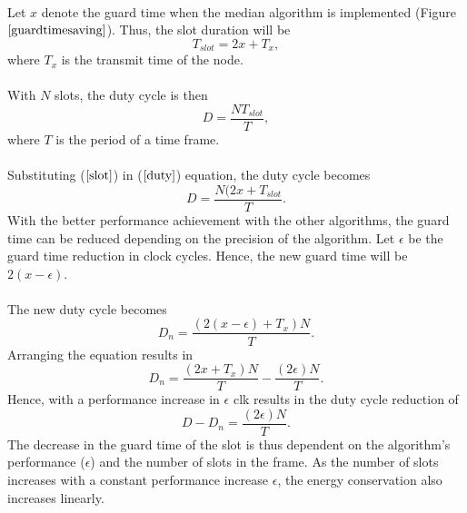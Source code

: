 \documentclass[a4paper,10pt]{report}
\begin{document}
\paragraph*{}
Let $x$ denote the guard time when the median algorithm is implemented (Figure $\ref{guardtimesaving}$). Thus, the slot
duration will be
\begin{equation}
T_{slot}=2x + T_x ,
\label{slot}
\end{equation}
where $T_x$ is the transmit time of the node.
\paragraph*{}
With $N$ slots, the duty cycle is then
\begin{equation}
D = \frac{NT_{slot}}{T}, \label{duty}
\end{equation}
where $T$ is the period of a time frame. \paragraph*{} Substituting ($\ref{slot}$) in ($\ref{duty}$) equation, the duty cycle becomes
\begin{equation}
D= \frac{N(2x+T_{slot}}{T}.
\end{equation}
With the better performance achievement with the other algorithms, the guard time can be reduced depending on the precision of the
algorithm. Let $\epsilon$ be the guard time reduction in clock cycles. Hence, the new guard time will be $2(x-\epsilon)$.
\paragraph*{} The new duty cycle becomes
\begin{equation}
D_n=\frac{(2(x-\epsilon)+T_x)N}{T}.
\end{equation}
Arranging the equation results in
\begin{equation}
D_n= \frac{(2x+T_x)N}{T} - \frac{(2\epsilon)N}{T}.
\end{equation}
Hence, with a performance increase in $\epsilon$ clk results in the duty cycle reduction of
\begin{equation}
D - D_n = \frac{(2\epsilon)N}{T}.
\end{equation}
The decrease in the guard time of the slot is thus dependent on the algorithm's performance ($\epsilon$) and the number of slots in the frame. As the number of slots increases with a constant performance increase $\epsilon$, the energy conservation also increases linearly.
\end{document}

